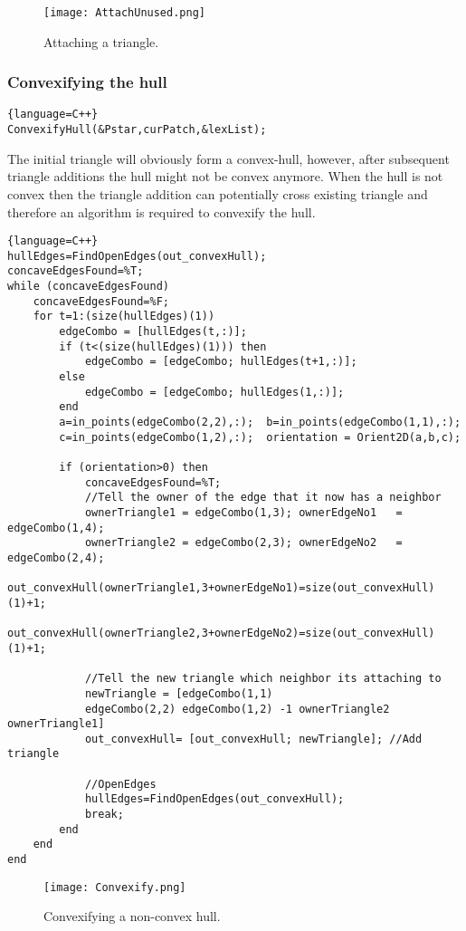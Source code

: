 \documentclass[11pt,letterpaper,titlepage]{article}
\begin{document}
\begin{figure}[h]
\centering
\texttt{[image: AttachUnused.png]}
\caption{Attaching a triangle.}
\label{fig:AttachUnused}
\end{figure}

\newpage
\subsubsection{Convexifying the hull}

\begin{lstlisting}{language=C++}
ConvexifyHull(&Pstar,curPatch,&lexList);
\end{lstlisting}
The initial triangle will obviously form a convex-hull, however, after subsequent triangle additions the hull might not be convex anymore. When the hull is not convex then the triangle addition can potentially cross existing triangle and therefore an algorithm is required to convexify the hull.

\begin{lstlisting}{language=C++}
hullEdges=FindOpenEdges(out_convexHull);
concaveEdgesFound=%T;
while (concaveEdgesFound)
    concaveEdgesFound=%F;
    for t=1:(size(hullEdges)(1))
        edgeCombo = [hullEdges(t,:)];
        if (t<(size(hullEdges)(1))) then
            edgeCombo = [edgeCombo; hullEdges(t+1,:)];
        else
            edgeCombo = [edgeCombo; hullEdges(1,:)];
        end
        a=in_points(edgeCombo(2,2),:);  b=in_points(edgeCombo(1,1),:);
        c=in_points(edgeCombo(1,2),:);  orientation = Orient2D(a,b,c);
        
        if (orientation>0) then
            concaveEdgesFound=%T;
            //Tell the owner of the edge that it now has a neighbor
            ownerTriangle1 = edgeCombo(1,3); ownerEdgeNo1   = edgeCombo(1,4);
            ownerTriangle2 = edgeCombo(2,3); ownerEdgeNo2   = edgeCombo(2,4);
            out_convexHull(ownerTriangle1,3+ownerEdgeNo1)=size(out_convexHull)(1)+1;
            out_convexHull(ownerTriangle2,3+ownerEdgeNo2)=size(out_convexHull)(1)+1;
            
            //Tell the new triangle which neighbor its attaching to
            newTriangle = [edgeCombo(1,1) 
            edgeCombo(2,2) edgeCombo(1,2) -1 ownerTriangle2 ownerTriangle1]
            out_convexHull= [out_convexHull; newTriangle]; //Add triangle

            //OpenEdges
            hullEdges=FindOpenEdges(out_convexHull);
            break;
        end                  
    end
end
\end{lstlisting}
\begin{figure}[h]
\centering
\texttt{[image: Convexify.png]}
\caption{Convexifying a non-convex hull.}
\label{fig:Convexify}
\end{figure}
\end{document}

